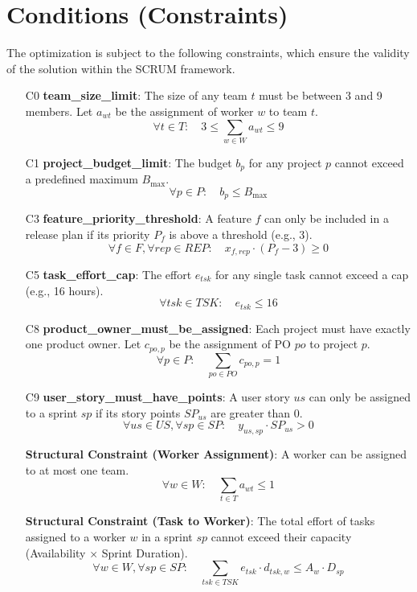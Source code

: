 \documentclass{article}
\begin{document}
\section{Conditions (Constraints)}
The optimization is subject to the following constraints, which ensure the validity of the solution within the SCRUM framework.
\begin{itemize}
    \item[C0] \textbf{team\_size\_limit}: The size of any team $t$ must be between 3 and 9 members. Let $a_{wt}$ be the assignment of worker $w$ to team $t$.
    $$ \forall t \in T: \quad 3 \le \sum_{w \in W} a_{wt} \le 9 $$
    \item[C1] \textbf{project\_budget\_limit}: The budget $b_p$ for any project $p$ cannot exceed a predefined maximum $B_{\max}$.
    $$ \forall p \in P: \quad b_p \le B_{\max} $$
    \item[C3] \textbf{feature\_priority\_threshold}: A feature $f$ can only be included in a release plan if its priority $P_f$ is above a threshold (e.g., 3).
    $$ \forall f \in F, \forall rep \in REP: \quad x_{f,rep} \cdot (P_f - 3) \ge 0 $$
    \item[C5] \textbf{task\_effort\_cap}: The effort $e_{tsk}$ for any single task cannot exceed a cap (e.g., 16 hours).
    $$ \forall tsk \in TSK: \quad e_{tsk} \le 16 $$
    \item[C8] \textbf{product\_owner\_must\_be\_assigned}: Each project must have exactly one product owner. Let $c_{po,p}$ be the assignment of PO $po$ to project $p$.
    $$ \forall p \in P: \quad \sum_{po \in PO} c_{po,p} = 1 $$
    \item[C9] \textbf{user\_story\_must\_have\_points}: A user story $us$ can only be assigned to a sprint $sp$ if its story points $SP_{us}$ are greater than 0.
    $$ \forall us \in US, \forall sp \in SP: \quad y_{us,sp} \cdot SP_{us} > 0 $$
    \item[] \textbf{Structural Constraint (Worker Assignment)}: A worker can be assigned to at most one team.
    $$ \forall w \in W: \quad \sum_{t \in T} a_{wt} \le 1 $$
    \item[] \textbf{Structural Constraint (Task to Worker)}: The total effort of tasks assigned to a worker $w$ in a sprint $sp$ cannot exceed their capacity (Availability $\times$ Sprint Duration).
    $$ \forall w \in W, \forall sp \in SP: \quad \sum_{tsk \in TSK} e_{tsk} \cdot d_{tsk,w} \le A_w \cdot D_{sp} $$
\end{itemize}
\end{document}
